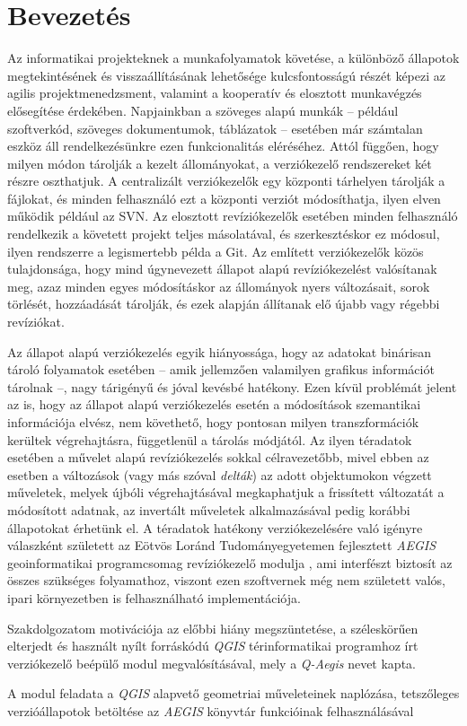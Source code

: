 \chapter{Bevezetés}
\label{ch:intro}

Az informatikai projekteknek a munkafolyamatok követése, a különböző állapotok megtekintésének és visszaállításának lehetősége kulcsfontosságú részét képezi az agilis projektmenedzsment, valamint a kooperatív és elosztott munkavégzés elősegítése érdekében. Napjainkban a szöveges alapú munkák -- például szoftverkód, szöveges dokumentumok, táblázatok -- esetében már számtalan eszköz áll rendelkezésünkre ezen funkcionalitás eléréséhez. Attól függően, hogy milyen módon tárolják a kezelt állományokat, a verziókezelő rendszereket két részre oszthatjuk. A centralizált verziókezelők egy központi tárhelyen tárolják a fájlokat, és minden felhasználó ezt a központi verziót módosíthatja, ilyen elven működik például az SVN. Az elosztott revíziókezelők esetében minden felhasználó rendelkezik a követett projekt teljes másolatával, és szerkesztéskor ez módosul, ilyen rendszerre a legismertebb példa a Git.
Az említett verziókezelők közös tulajdonsága, hogy mind úgynevezett állapot alapú revíziókezelést valósítanak meg, azaz minden egyes módosításkor az állományok nyers változásait, sorok törlését, hozzáadását tárolják, és ezek alapján állítanak elő újabb vagy régebbi revíziókat.

Az állapot alapú verziókezelés egyik hiányossága, hogy az adatokat binárisan tároló folyamatok esetében -- amik jellemzően valamilyen grafikus információt tárolnak --, nagy tárigényű és jóval kevésbé hatékony. Ezen kívül problémát jelent az is, hogy az állapot alapú verziókezelés esetén a módosítások szemantikai információja elvész, nem követhető, hogy pontosan milyen transzformációk kerültek végrehajtásra, függetlenül a tárolás módjától.
Az ilyen téradatok esetében a művelet alapú revíziókezelés sokkal célravezetőbb, mivel ebben az esetben a változások (vagy más szóval \emph{delták}) az adott objektumokon végzett műveletek, melyek újbóli végrehajtásával megkaphatjuk a frissített változatát a módosított adatnak, az invertált műveletek alkalmazásával pedig korábbi állapotokat érhetünk el.
A téradatok hatékony verziókezelésére való igényre válaszként született az Eötvös Loránd Tudományegyetemen fejlesztett \emph{AEGIS} geoinformatikai programcsomag \cite{giachetta2013aegis, aegis} revíziókezelő modulja \cite{cserep2013versioning,cserep2015operation}, ami interfészt biztosít az összes szükséges folyamathoz, viszont ezen szoftvernek még nem született valós, ipari környezetben is felhasználható implementációja.

Szakdolgozatom motivációja az előbbi hiány megszüntetése, a széleskörűen elterjedt és használt nyílt forráskódú \emph{QGIS} térinformatikai programhoz \cite{qgis} írt verziókezelő beépülő modul megvalósításával, mely a \emph{Q-Aegis} nevet kapta.

A modul feladata a \emph{QGIS} alapvető geometriai műveleteinek naplózása, tetszőleges verzióállapotok betöltése az \emph{AEGIS} könyvtár funkcióinak felhasználásával

